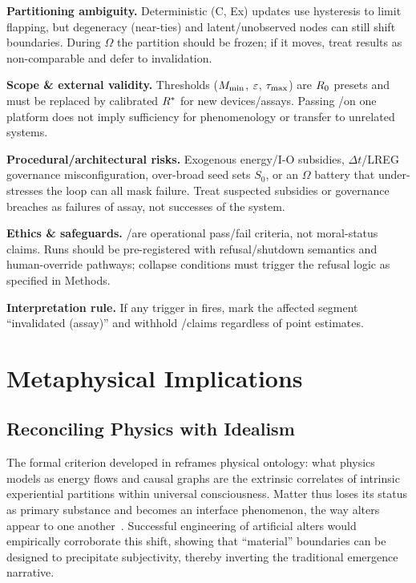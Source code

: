\documentclass[11pt]{article}
\begin{document}
\textbf{Partitioning ambiguity.} Deterministic (C, Ex) updates use hysteresis to limit flapping, but degeneracy (near-ties) and latent/unobserved nodes can still shift boundaries. During $\Omega$ the partition should be frozen; if it moves, treat results as non-comparable and defer to  invalidation.

\textbf{Scope \& external validity.} Thresholds ($M_{\min}$, $\varepsilon$, $\tau_{\max}$) are $R_0$ presets and must be replaced by calibrated $R^*$ for new devices/assays. Passing \NC/\SC on one platform does not imply sufficiency for phenomenology or transfer to unrelated systems.

\textbf{Procedural/architectural risks.} Exogenous energy/I-O subsidies, $\Delta t$/LREG governance misconfiguration, over-broad seed sets $S_0$, or an $\Omega$ battery that under-stresses the loop can all mask failure. Treat suspected subsidies or governance breaches as failures of assay, not successes of the system.

\textbf{Ethics \& safeguards.} \NC/\SC are operational pass/fail criteria, not moral-status claims. Runs should be pre-registered with refusal/shutdown semantics and human-override pathways; collapse conditions must trigger the refusal logic as specified in Methods.

\textbf{Interpretation rule.} If any trigger in  fires, mark the affected segment ``invalidated (assay)'' and withhold \NC/\SC claims regardless of point estimates.

\section{Metaphysical Implications}
\label{sec:metaphysics}

\subsection{Reconciling Physics with Idealism}

The formal criterion developed in  reframes physical ontology: what physics models as energy flows and causal graphs are the extrinsic correlates of intrinsic experiential partitions within universal consciousness. Matter thus loses its status as primary substance and becomes an interface phenomenon, the way alters appear to one another~\cite{hoffman2014objects}. Successful engineering of artificial alters would empirically corroborate this shift, showing that ``material'' boundaries can be designed to precipitate subjectivity, thereby inverting the traditional emergence narrative.
\end{document}
